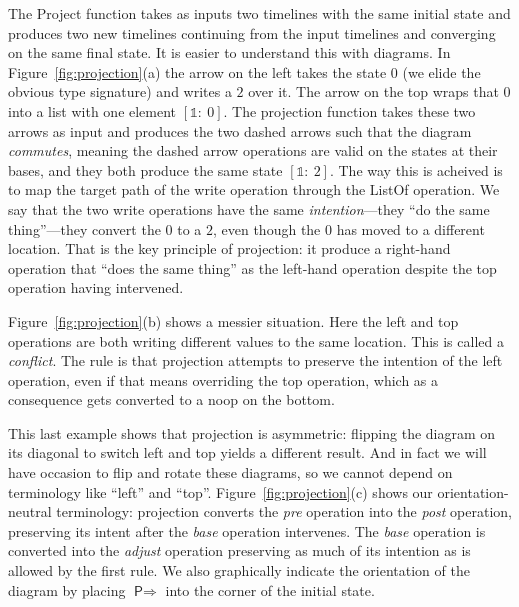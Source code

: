 \documentclass[english,submission]{programming}
\theoremstyle{definition}
\newcommand{\is}{{:}\ }
\begin{document}
The \textsf{Project} function takes as inputs two timelines with the same initial state and produces two new timelines continuing from the input timelines and converging on the same final state. It is easier to understand this with diagrams.
In Figure~\ref{fig:projection}(a) the arrow on the left takes the state $0$ (we elide the obvious type signature) and writes a $2$ over it. The arrow on the top wraps that $0$ into a list with one element $[\mathbb{1}\is 0]$. The projection function takes these two arrows as input and produces the two dashed arrows such that the diagram \textit{commutes}, meaning the dashed arrow operations are valid on the states at their bases, and they both produce the same state $[\mathbb{1}\is 2]$. The way this is acheived is to map the target path of the \textsf{write} operation through the \textsf{ListOf} operation. We say that the two \textsf{write} operations have the same \textit{intention}---they ``do the same thing''---they convert the $0$ to a $2$, even though the $0$ has moved to a different location. That is the key principle of projection: it produce a right-hand operation that ``does the same thing'' as the left-hand operation despite the top operation having intervened.

Figure~\ref{fig:projection}(b) shows a messier situation. Here the left and top operations are both writing different values to the same location. This is called a \textit{conflict}. The rule is that projection attempts to preserve the intention of the left operation, even if that means overriding the top operation, which as a consequence gets converted to a \textsf{noop} on the bottom.

This last example shows that projection is asymmetric: flipping the diagram on its diagonal to switch left and top yields a different result. And in fact we will have occasion to flip and rotate these diagrams, so we cannot depend on terminology like ``left'' and ``top''. Figure~\ref{fig:projection}(c) shows our orientation-neutral terminology: projection converts the \textit{pre} operation into the \textit{post} operation, preserving its intent after the \textit{base} operation intervenes. The \textit{base} operation is converted into the \textit{adjust} operation preserving as much of its intention as is allowed by the first rule. We also graphically indicate the orientation of the diagram by placing $\textsf{P}\!\Rightarrow$ into the corner of the initial state.
\end{document}
